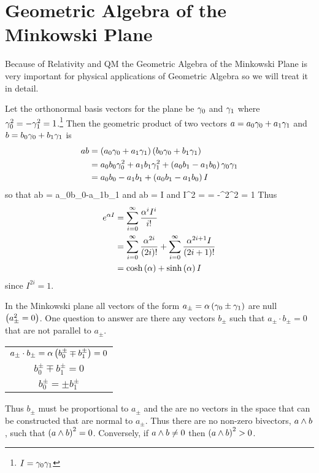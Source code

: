\section{Geometric Algebra of the Minkowski Plane}
Because of Relativity and QM the Geometric Algebra of the Minkowski Plane is very important for physical applications of Geometric Algebra so we will treat it in detail.

Let the orthonormal basis vectors for the plane be $\gamma_{0}$ and $\gamma_{1}$ where $\gamma_{0}^{2}=-\gamma_{1}^{2}=1$.\footnote{$I = \gamma_{0}\gamma_{1}$} Then the geometric product of
two vectors $a=a_{0}\gamma_{0}+a_{1}\gamma_{1}$ and $b=b_{0}\gamma_{0}+b_{1}\gamma_{1}$ is
\begin{align}
	ab &= \left ( {a_{0}\gamma_{0}+a_{1}\gamma_{1}} \right )\left ( {b_{0}\gamma_{0}+b_{1}\gamma_{1}} \right ) \\
	   &= a_{0}b_{0}\gamma_{0}^{2}+a_{1}b_{1}\gamma_{1}^{2}+\left ( {a_{0}b_{1}-a_{1}b_{0}} \right )\gamma_{0}\gamma_{1} \\
	   &= a_{0}b_{0}-a_{1}b_{1}+\left ( {a_{0}b_{1}-a_{1}b_{0}} \right ) I
\end{align}
so that
\be
	a\cdot b = a_{0}b_{0}-a_{1}b_{1}
\ee
and
\be
	a\w b = I
\ee
and
\be
	I^{2} = \gO\gl\gO\gl = -\gO^{2}\gl^{2} = 1
\ee
Thus
\begin{align}
	e^{\alpha I} &= \sum_{i=0}^{\infty}\displaystyle\frac{\alpha^{i}I^{i}}{i!} \\
				 &= \sum_{i=0}^{\infty}\displaystyle\frac{\alpha^{2i}}{\left ( {2i} \right )!}+
 						\sum_{i=0}^{\infty}\displaystyle\frac{\alpha^{2i+1}I}{\left ( {2i+1} \right )!} \\
			     &= \cosh\left ( {\alpha} \right )+\sinh\left ( {\alpha} \right ) I
\end{align}
since $I^{2i} = 1$.

In the Minkowski plane all vectors of the form $a_{\pm} = \alpha\left ( {\gamma_{0}\pm\gamma_{1}} \right )$ are null $\left ( {a_{\pm}^{2}=0} \right )$. One
question to answer are there any vectors $b_{\pm}$ such that $a_{\pm}\cdot b_{\pm} = 0$ that are not parallel to
$a_{\pm}$.
\begin{center}
\begin{tabular}{c}
$a_{\pm}\cdot b_{\pm} = \alpha\left ( {b_{0}^{\pm}\mp b_{1}^{\pm}} \right ) = 0 $ \\
$b_{0}^{\pm} \mp b_{1}^{\pm} = 0 $ \\
$b_{0}^{\pm} = \pm b_{1}^{\pm} $
\end{tabular}
\end{center}
Thus $b_{\pm}$ must be proportional to $a_{\pm}$ and the are no vectors in the space that can be constructed that are normal to $a_{\pm}$. Thus there are no non-zero bivectors, $a \wedge b$, such that $\left ( {a\wedge b} \right )^{2}=0$.
Conversely, if $a \wedge b \ne 0$ then $\left ( {a \wedge b} \right )^{2} > 0$.

